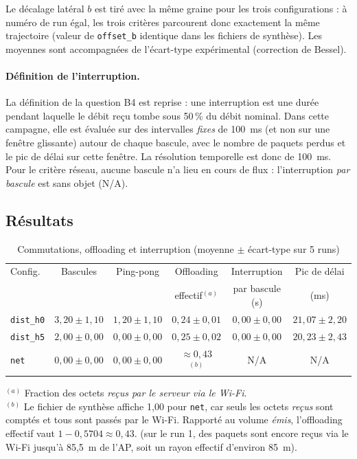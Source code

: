 Le décalage latéral $b$ est tiré avec la même graine pour les trois
configurations : à numéro de run égal, les trois critères parcourent donc
exactement la même trajectoire (valeur de \texttt{offset\_b} identique dans
les fichiers de synthèse). Les moyennes sont accompagnées de l'écart-type
expérimental (correction de Bessel).

\paragraph{Définition de l'interruption.}
La définition de la question B4 est reprise : une interruption est une durée
pendant laquelle le débit reçu tombe sous 50\,\% du débit nominal. Dans cette
campagne, elle est évaluée sur des intervalles \emph{fixes} de 100~ms (et non
sur une fenêtre glissante) autour de chaque bascule, avec le nombre de
paquets perdus et le pic de délai sur cette fenêtre. La résolution temporelle
est donc de 100~ms. Pour le critère réseau, aucune bascule n'a lieu en cours
de flux : l'interruption \emph{par bascule} est sans objet (N/A).

\subsection{Résultats}

\begin{table}[H]
\centering
\caption{Commutations, offloading et interruption (moyenne $\pm$ écart-type sur 5 runs)}
\small
\begin{tabular}{lccccc}
\toprule
Config. & Bascules & Ping-pong & Offloading & Interruption & Pic de délai \\
        &          &           & effectif$^{(a)}$ & par bascule (s) & (ms) \\
\midrule
\texttt{dist\_h0} & $3{,}20 \pm 1{,}10$ & $1{,}20 \pm 1{,}10$ & $0{,}24 \pm 0{,}01$ & $0{,}00 \pm 0{,}00$ & $21{,}07 \pm 2{,}20$ \\
\texttt{dist\_h5} & $2{,}00 \pm 0{,}00$ & $0{,}00 \pm 0{,}00$ & $0{,}25 \pm 0{,}02$ & $0{,}00 \pm 0{,}00$ & $20{,}23 \pm 2{,}43$ \\
\texttt{net}      & $0{,}00 \pm 0{,}00$ & $0{,}00 \pm 0{,}00$ & $\approx 0{,}43$ $^{(b)}$ & N/A & N/A \\
\bottomrule
\end{tabular}

\smallskip
\begin{minipage}{0.92\textwidth}\footnotesize
$^{(a)}$ Fraction des octets \emph{reçus par le serveur via le Wi-Fi}.\\
$^{(b)}$ Le fichier de synthèse affiche 1,00 pour \texttt{net}, car seuls les
octets \emph{reçus} sont comptés et tous sont passés par le Wi-Fi. Rapporté au
volume \emph{émis}, l'offloading effectif vaut $1 - 0{,}5704 \approx 0{,}43$.
(sur le run 1, des paquets sont encore reçus via le Wi-Fi jusqu'à
85,5~m de l'AP, soit un rayon effectif d'environ 85~m).
\end{minipage}
\end{table}

